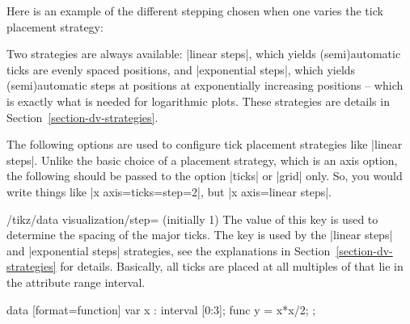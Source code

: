 Here is an example of the different stepping chosen when one varies the tick
placement strategy:
%
\begin{codeexample}[preamble={\usetikzlibrary{datavisualization.formats.functions}}]
\qquad
{}
\end{codeexample}

Two strategies are always available: |linear steps|, which yields
(semi)automatic ticks are evenly spaced positions, and |exponential steps|,
which yields (semi)automatic steps at positions at exponentially increasing
positions -- which is exactly what is needed for logarithmic plots. These
strategies are details in Section~\ref{section-dv-strategies}.

The following options are used to configure tick placement strategies like
|linear steps|. Unlike the basic choice of a placement strategy, which is an
axis option, the following should be passed to the option |ticks| or |grid|
only. So, you would write things like |x axis={ticks={step=2}}|, but
|x axis={linear steps}|.

\begin{key}{/tikz/data visualization/step= (initially 1)}
    The value of this key is used to determine the spacing of the major ticks.
    The key is used by the |linear steps| and |exponential steps| strategies,
    see the explanations in Section~\ref{section-dv-strategies} for details.
    Basically, all ticks are placed at all multiples of  that lie
    in the attribute range interval.
\begin{codeexample}[preamble={\usetikzlibrary{datavisualization.formats.functions}}]
\tikz \datavisualization [
    school book axes, visualize as smooth line,
    y axis={ticks={step=1.25}},
  ]
    data [format=function] {
      var x : interval [0:3];
      func y = \value x*\value x/2;
    };
\end{codeexample}
\end{key}

